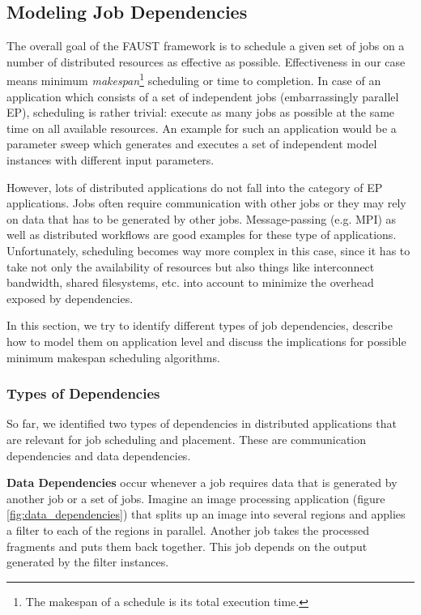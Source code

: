 \subsection{Modeling Job Dependencies}

The overall goal of the FAUST framework is to schedule a given set of jobs on a number of distributed resources as effective as possible. Effectiveness in our case means minimum \textit{makespan}\footnote{The makespan of a schedule is its total execution time.} scheduling or time to completion. In case of an application which consists of a
set of independent jobs (embarrassingly parallel EP), scheduling is rather trivial:
execute as many jobs as possible at the same time on all available resources. An
example for such an application would be a parameter sweep which generates and executes  a set of independent model instances with different input parameters.

However, lots of distributed applications do not fall into the category of EP applications. Jobs often require communication with other jobs or they may rely on data  that has to be generated by other jobs. Message-passing (e.g. MPI) as well as distributed workflows are good examples for these type of applications. Unfortunately, scheduling becomes way more complex in this case, since it has to take not only the availability of resources but also things like interconnect bandwidth, shared filesystems, etc. into account to minimize the overhead exposed by dependencies.

In this section, we try to identify different types of job dependencies, describe how to model them on application level and discuss the implications for possible minimum 
makespan scheduling algorithms.

\subsubsection{Types of Dependencies}

So far, we identified two types of dependencies in distributed applications that are relevant for job scheduling and placement. These are communication dependencies and data dependencies. 

\textbf{Data Dependencies} occur whenever a job requires data that is generated by another job or a set of jobs. Imagine an image processing application (figure \ref{fig:data_dependencies}) that splits up an image into several regions and applies a filter to each of the regions in parallel. Another job takes the processed fragments and puts them back together. This job depends on the output generated by the filter instances. 

